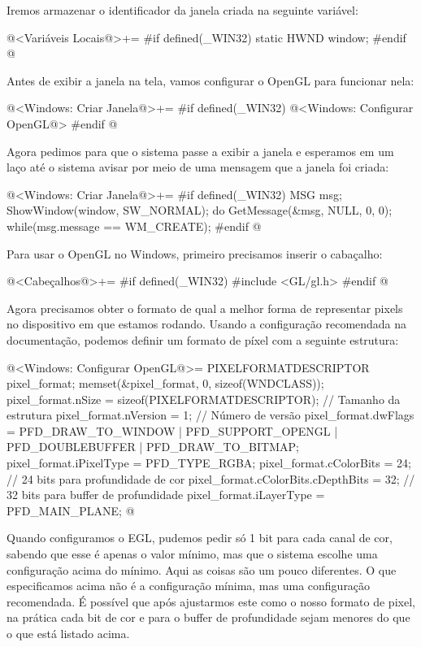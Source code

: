 Iremos armazenar o identificador da janela criada na seguinte
variável:

\iniciocodigo
@<Variáveis Locais@>+=
#if defined(_WIN32)
static HWND window;
#endif
@
\fimcodigo

Antes de exibir a janela na tela, vamos configurar o OpenGL para
funcionar nela:

\iniciocodigo
@<Windows: Criar Janela@>+=
#if defined(_WIN32)
@<Windows: Configurar OpenGL@>
#endif
@
\fimcodigo

Agora pedimos para que o sistema passe a exibir a janela e esperamos
em um laço até o sistema avisar por meio de uma mensagem que a janela
foi criada:

\iniciocodigo
@<Windows: Criar Janela@>+=
#if defined(_WIN32)
{
  MSG msg;
  ShowWindow(window, SW_NORMAL);
  do{
    GetMessage(&msg, NULL, 0, 0);
  } while(msg.message == WM_CREATE);
}
#endif
@
\fimcodigo


Para usar o OpenGL no Windows, primeiro precisamos inserir o
cabaçalho:

\iniciocodigo
@<Cabeçalhos@>+=
#if defined(_WIN32)
#include <GL/gl.h>
#endif
@
\fimcodigo

Agora precisamos obter o formato de qual a melhor forma de representar
pixels no dispositivo em que estamos rodando. Usando a configuração
recomendada na documentação, podemos definir um formato de píxel com a
seguinte estrutura:

\iniciocodigo
@<Windows: Configurar OpenGL@>=
PIXELFORMATDESCRIPTOR pixel_format;
memset(&pixel_format, 0, sizeof(WNDCLASS));
pixel_format.nSize = sizeof(PIXELFORMATDESCRIPTOR); // Tamanho da estrutura
pixel_format.nVersion = 1; // Número de versão
pixel_format.dwFlags = PFD_DRAW_TO_WINDOW | PFD_SUPPORT_OPENGL |
                       PFD_DOUBLEBUFFER | PFD_DRAW_TO_BITMAP;
pixel_format.iPixelType = PFD_TYPE_RGBA;
pixel_format.cColorBits = 24; // 24 bits para profundidade de cor
pixel_format.cColorBits.cDepthBits = 32; // 32 bits para buffer de profundidade
pixel_format.iLayerType = PFD_MAIN_PLANE;
@
\fimcodigo

Quando configuramos o EGL, pudemos pedir só 1 bit para cada canal de
cor, sabendo que esse é apenas o valor mínimo, mas que o sistema
escolhe uma configuração acima do mínimo. Aqui as coisas são um pouco
diferentes. O que especificamos acima não é a configuração mínima, mas
uma configuração recomendada. É possível que após ajustarmos este como
o nosso formato de pixel, na prática cada bit de cor e para o buffer
de profundidade sejam menores do que o que está listado acima.

